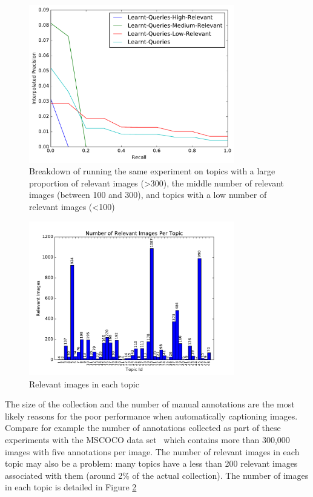 \FloatBarrier
\begin{figure}[t]
    \centering
    \includegraphics[width=0.8\textwidth]{graphs/learnt-queries}
    \caption{Breakdown of running the same experiment on topics with a large proportion of relevant images (\textgreater 300), the middle number of relevant images (between 100 and 300), and topics with a low number of relevant images (\textless 100)}
    \label{fig:learnt-queries}
\end{figure}

\begin{figure}[b]
    \centering
    \includegraphics[width=0.8\textwidth]{graphs/relevant-images}
    \caption{Relevant images in each topic}
    \label{fig:relevant-images}
\end{figure}
\FloatBarrier

The size of the collection and the number of manual annotations are the most likely reasons for the poor performance when automatically captioning images. Compare for example the number of annotations collected as part of these experiments with the MSCOCO data set~\cite{lin2014microsoft} which contains more than 300,000 images with five annotations per image. The number of relevant images in each topic may also be a problem: many topics have a less than 200 relevant images associated with them (around 2\% of the actual collection). The number of images in each topic is detailed in Figure \ref{fig:relevant-images}

